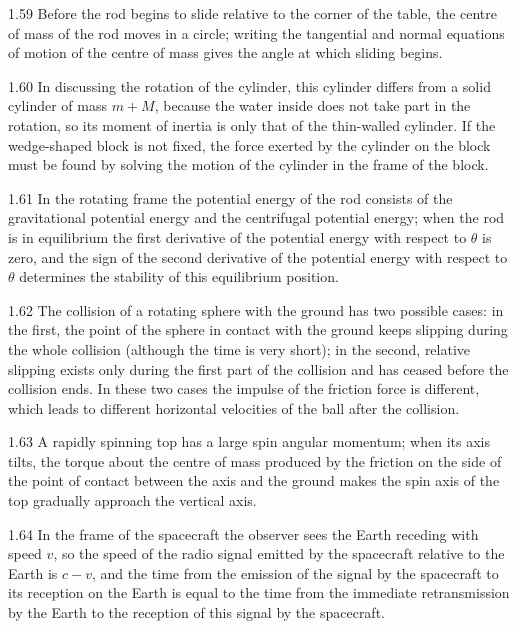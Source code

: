 \begin{hint}{1.59}
Before the rod begins to slide relative to the corner of the table, the centre of mass of the rod moves in a circle; writing the tangential and normal equations of motion of the centre of mass gives the angle at which sliding begins.
\end{hint}

\begin{hint}{1.60}
In discussing the rotation of the cylinder, this cylinder differs from a solid cylinder of mass $m+M$, because the water inside does not take part in the rotation, so its moment of inertia is only that of the thin-walled cylinder. If the wedge-shaped block is not fixed, the force exerted by the cylinder on the block must be found by solving the motion of the cylinder in the frame of the block.
\end{hint}

\begin{hint}{1.61}
In the rotating frame the potential energy of the rod consists of the gravitational potential energy and the centrifugal potential energy; when the rod is in equilibrium the first derivative of the potential energy with respect to $\theta$ is zero, and the sign of the second derivative of the potential energy with respect to $\theta$ determines the stability of this equilibrium position.
\end{hint}

\begin{hint}{1.62}
The collision of a rotating sphere with the ground has two possible cases: in the first, the point of the sphere in contact with the ground keeps slipping during the whole collision (although the time is very short); in the second, relative slipping exists only during the first part of the collision and has ceased before the collision ends. In these two cases the impulse of the friction force is different, which leads to different horizontal velocities of the ball after the collision.
\end{hint}

\begin{hint}{1.63}
A rapidly spinning top has a large spin angular momentum; when its axis tilts, the torque about the centre of mass produced by the friction on the side of the point of contact between the axis and the ground makes the spin axis of the top gradually approach the vertical axis.
\end{hint}

\begin{hint}{1.64}
In the frame of the spacecraft the observer sees the Earth receding with speed $v$, so the speed of the radio signal emitted by the spacecraft relative to the Earth is $c-v$, and the time from the emission of the signal by the spacecraft to its reception on the Earth is equal to the time from the immediate retransmission by the Earth to the reception of this signal by the spacecraft.
\end{hint}

